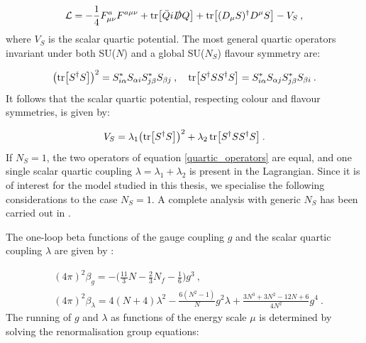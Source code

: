 \begin{equation}
\mathcal L = -\frac{1}{4} F_{\mu\nu}^a F^{a \mu\nu} + \tr \bigl[ \bar Q i \slashed D Q\bigr] + \tr \bigl[ (D_{\mu}S)^{\dagger} D^{\mu} S\bigr] - V_S \: ,
\end{equation}
%
where $V_S$ is the scalar quartic potential. The most general quartic operators invariant under both SU($N$) and a global SU($N_S$) flavour symmetry are:

\begin{equation}
\bigl( \tr \bigl[ S^{\dagger} S \bigr] \bigr)^2 = S^*_{i \alpha} S_{\alpha i} S^*_{j \beta} S_{\beta j} \: , \quad 
\tr \bigl[ S^{\dagger} S S^{\dagger} S \bigr] = S^*_{i \alpha} S_{\alpha j} S^*_{j \beta} S_{\beta i} \: .
\label{quartic_operators}
\end{equation}
%
It follows that the scalar quartic potential, respecting colour and flavour symmetries, is given by:

\begin{equation}
V_S = \lambda_1 \bigl( \tr \bigl[ S^{\dagger} S \bigr] \bigr)^2 + \lambda_2 \tr \bigl[ S^{\dagger} S S^{\dagger} S \bigr]  \: .
\label{quartic_potential}
\end{equation}
%
If $N_S =1$, the two operators of equation \ref{quartic_operators} are equal, and one single scalar quartic coupling $\lambda = \lambda_1 + \lambda_2$ is present in the Lagrangian. Since it is of interest for the model studied in this thesis, we specialise the following considerations to the case $N_S = 1$. A complete analysis with generic $N_S$ has been carried out in \cite{Hansen:2017pwe}.

The one-loop beta functions of the gauge coupling $g$ and the scalar quartic coupling $\lambda$ are given by \cite{Sannino:2016sfx}:

\begin{equation}
\begin{split}
 & (4 \pi)^2 \beta_g = - \biggl( \frac{11}{3} N - \frac{2}{3} N_f - \frac{1}{6} \biggr) g^3 \: ,\\
 & (4 \pi)^2 \beta_{\lambda} = 4(N +4) \lambda^2 -\frac{6(N^2 -1)}{N} g^2 \lambda + \frac{3N^3 + 3N^2 -12N + 6}{4 N^2} g^4 \: .
 \label{beta_functions}
\end{split}
\end{equation}
%
The running of $g$ and $\lambda$ as functions of the energy scale $\mu$ is determined by solving the renormalisation group equations:

